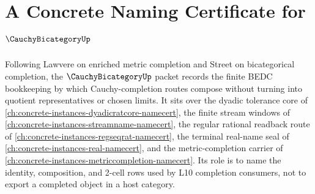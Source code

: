 \chapter{A Concrete Naming Certificate for $\CauchyBicategoryUp$}
\label{ch:concrete-instances-cauchy-bicategory-namecert}

Following Lawvere on enriched metric completion and Street on bicategorical completion, the $\CauchyBicategoryUp$ packet records the finite BEDC bookkeeping by which Cauchy-completion routes compose without turning into quotient representatives or chosen limits. It sits over the dyadic tolerance core of \autoref{ch:concrete-instances-dyadicratcore-namecert}, the finite stream windows of \autoref{ch:concrete-instances-streamname-namecert}, the regular rational readback route of \autoref{ch:concrete-instances-regseqrat-namecert}, the terminal real-name seal of \autoref{ch:concrete-instances-real-namecert}, and the metric-completion carrier of \autoref{ch:concrete-instances-metriccompletion-namecert}. Its role is to name the identity, composition, and 2-cell rows used by L10 completion consumers, not to export a completed object in a host category.

